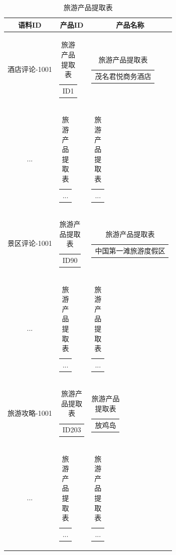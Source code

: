 \documentclass[bwprint]{gmcmthesis}
\begin{document}
\begin{center}
  \begin{longtable}{c|c|c}
    \caption{旅游产品提取表}
    \label{wx_yj_related}\\
      \hline
      \textbf{语料ID} & \textbf{产品ID} & \textbf{产品名称} \\
      \hline
      酒店评论-1001 & \begin{tabular}[c]{@{}c@{}}
        ID1
        \end{tabular} 
        & \begin{tabular}[c]{@{}l@{}}
          茂名君悦商务酒店
        \end{tabular} \\
        ... & \begin{tabular}[c]{@{}c@{}}
          ...
        \end{tabular} 
        & \begin{tabular}[c]{@{}l@{}}
          ...
        \end{tabular} \\
        景区评论-1001 & \begin{tabular}[c]{@{}c@{}}
          ID90
          \end{tabular} 
          & \begin{tabular}[c]{@{}l@{}}
            中国第一滩旅游度假区
          \end{tabular} \\
          ... & \begin{tabular}[c]{@{}c@{}}
            ...
          \end{tabular} 
          & \begin{tabular}[c]{@{}l@{}}
            ...
          \end{tabular} \\
          旅游攻略-1001 & \begin{tabular}[c]{@{}c@{}}
            ID203
            \end{tabular} 
            & \begin{tabular}[c]{@{}l@{}}
              放鸡岛
            \end{tabular} \\
            ... & \begin{tabular}[c]{@{}c@{}}
              ...
            \end{tabular} 
            & \begin{tabular}[c]{@{}l@{}}
              ...
            \end{tabular} \\

\end{longtable}
\end{center}
\end{document}
